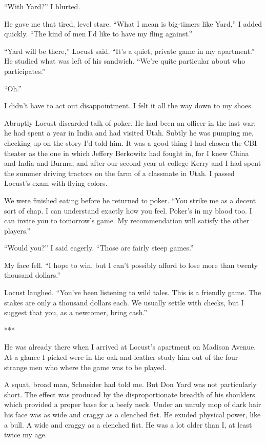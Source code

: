 \documentclass{novel}
\begin{document}
{“With Yard?” I blurted.

He gave me that tired, level stare. “What I mean is big-timers like Yard,” I added quickly. “The kind of men I’d like to have my fling against.”

“Yard will be there,” Locust said. “It’s a quiet, private game in my apartment.” He studied what was left of his sandwich. “We’re quite particular about who participates.”

“Oh.”

I didn’t have to act out disappointment. I felt it all the way down to my shoes.

Abruptly Locust discarded talk of poker. He had been an officer in the last war; he had spent a year in India and had visited Utah. Subtly he was pumping me, checking up on the story I’d told him. It was a good thing I had chosen the CBI theater as the one in which Jeffery Berkowitz had fought in, for I knew China and India and Burma, and after our second year at college Kerry and I had spent the summer driving tractors on the farm of a classmate in Utah. I passed Locust’s exam with flying colors.

We were finished eating before he returned to poker. “You strike me as a decent sort of chap. I can understand exactly how you feel. Poker’s in my blood too. I can invite you to tomorrow’s game. My recommendation will satisfy the other players.”

“Would you?” I said eagerly. “Those are fairly steep games.”

My face fell. “I hope to win, but I can’t possibly afford to lose more than twenty thousand dollars.”

Locust laughed. “You’ve been listening to wild tales. This is a friendly game. The stakes are only a thousand dollars each. We usually settle with checks, but I suggest that you, as a newcomer, bring cash.”

***

He was already there when I arrived at Locust’s apartment on Madison Avenue. At a glance I picked were in the oak-and-leather study him out of the four strange men who where the game was to be played.

A squat, broad man, Schneider had told me. But Don Yard was not particularly short. The effect was produced by the disproportionate breadth of his shoulders which provided a proper base for a beefy neck. Under an unruly mop of dark hair his face was as wide and craggy as a clenched fist. He exuded physical power, like a bull. A wide and craggy as a clenched fist. He was a lot older than I, at least twice my age.

}
\end{document}
